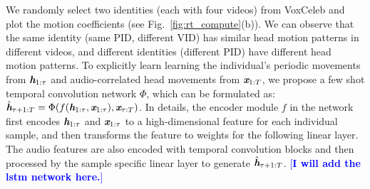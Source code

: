 \documentclass[runningheads]{llncs}
\def\mathbi#1{\textbf{\em #1}}
\providecommand{\lchen}[1]{\textcolor{blue}{[{\bf #1}]}}
\begin{document}
 \indent We randomly select two identities (each with four videos) from VoxCeleb and plot the motion coefficients (see Fig.~\ref{fig:rt_compute}(b)). We can observe that the same identity (same PID, different VID) has similar head motion patterns in different videos, and different identities (different PID) have different head motion patterns. To explicitly learn learning the individual's periodic movements from ${\mathbi{h}}_{1:\tau}$ and audio-correlated head movements from ${{\mathbi{x}}}_{1:T}$, %
 we propose a few shot temporal convolution network $\Phi$, which can be formulated as: ${\hat{\mathbi{h}}}_{\tau+1:T} = \Phi( f({{\mathbi{h}}}_{1:\tau}, {{\mathbi{x}}}_{1:\tau}), {{\mathbi{x}}}_{\tau:T})$. In details, the encoder module $f$ in the network first encodes ${\mathbi{h}}_{1:\tau}$ and ${{\mathbi{x}}}_{1:\tau}$ to a high-dimensional feature for each individual sample, and then transforms the feature to weights for the following linear layer. The audio features are also encoded with temporal convolution blocks and then processed by the sample specific linear layer to generate ${\hat{\mathbi{h}}}_{\tau+1:T}$. {\lchen{I will add the lstm network here.}}
 
\end{document}
